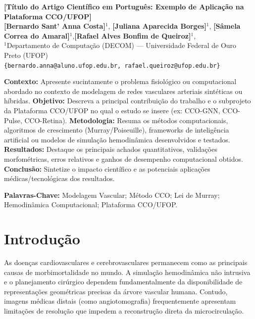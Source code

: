 \documentclass[11pt, a4paper]{article}
\begin{document}
\begin{center}
  {\LARGE \bfseries \textcolor{ufopred}{[Título do Artigo Científico em Português: Exemplo de Aplicação na Plataforma CCO/UFOP]}}\\[0.4cm]
  {\large \textbf{[Bernardo Sant' Anna Costa]}$^{1}$, \textbf{[Juliana Aparecida Borges]}$^{1}$, \textbf{[Sâmela Correa do Amaral]}$^{1}$,\textbf{[Rafael Alves Bonfim de Queiroz]}$^{1}$, }\\[0.2cm]
  {\small $^{1}$Departamento de Computação (DECOM) --- Universidade Federal de Ouro Preto (UFOP)\\[0.1cm]
  \texttt{\{bernardo.anna@aluno.ufop.edu.br, rafael.queiroz@ufop.edu.br\}}}\\[0.4cm]
\end{center}

\begin{tcolorbox}[colback=lightgray, colframe=deepnavy, arc=3pt, title=\textbf{RESUMO}, fonttitle=\bfseries]
\small
\textbf{Contexto:} Apresente sucintamente o problema fisiológico ou computacional abordado no contexto de modelagem de redes vasculares arteriais sintéticas ou híbridas. 
\textbf{Objetivo:} Descreva a principal contribuição do trabalho e o subprojeto da Plataforma CCO/UFOP no qual o estudo se insere (ex: CCO-GNN, CCO-Pulse, CCO-Retina).
\textbf{Metodologia:} Resuma os métodos computacionais, algoritmos de crescimento (Murray/Poiseuille), frameworks de inteligência artificial ou modelos de simulação hemodinâmica desenvolvidos e testados.
\textbf{Resultados:} Destaque os principais achados quantitativos, validações morfométricas, erros relativos e ganhos de desempenho computacional obtidos.
\textbf{Conclusão:} Sintetize o impacto científico e as potenciais aplicações médicas/tecnológicas dos resultados.

\vspace{0.2cm}
\textbf{Palavras-Chave:} Modelagem Vascular; Método CCO; Lei de Murray; Hemodinâmica Computacional; Plataforma CCO/UFOP.
\end{tcolorbox}

\vspace{0.4cm}

\section{Introdução}
As doenças cardiovasculares e cerebrovasculares permanecem como as principais causas de morbimortalidade no mundo. A simulação hemodinâmica não intrusiva e o planejamento cirúrgico dependem fundamentalmente da disponibilidade de representações geométricas precisas da árvore vascular humana. Contudo, imagens médicas distais (como angiotomografia) frequentemente apresentam limitações de resolução que impedem a reconstrução direta da microcirculação.
\end{document}
